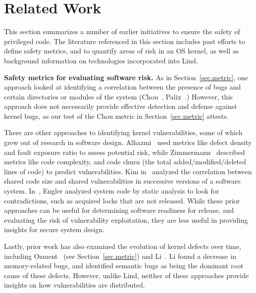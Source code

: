 \section{Related Work}
\label{sec.related_work}

This section summarizes a number of earlier initiatives to ensure the safety of
 privileged code. %
The literature referenced in this section includes past efforts to define safety metrics,
and to quantify areas of risk in an OS kernel, as well as background information
 on technologies incorporated into Lind.

\textbf{Safety metrics for evaluating software risk.}
As in Section~\ref{sec.metric}, one 
approach looked at identifying a correlation between the presence of bugs
and certain directories or modules of the system (Chou~\cite{PittSFIeld},
Palix~\cite{palix2011faults}.)
However, this approach does not necessarily
provide effective detection and defense against kernel bugs, as our test of the
Chou metric in Section~\ref{sec.metric} attests.

There are other approaches to identifying kernel vulnerabilities, some of
which grew out of research in 
software design.
Alhazmi~\cite{alhazmi2008application}
used metrics like defect density and fault exposure ratio to assess potential risk,
while Zimmermann~\cite{zimmermann2010searching}
described metrics like code complexity, and code churn (the total added/modified/deleted 
lines of code) to predict vulnerabilities. Kim in~\cite{kim2007vulnerability} analyzed
the correlation between shared code size and shared vulnerabilities in
successive versions of a software system. In~\cite{engler2001bugs}, Engler analyzed
system code by static analysis to look for contradictions, such as acquired locks that are
not released. While
these prior approaches can be useful for determining software readiness for release, and
evaluating the risk of vulnerability exploitation,
they are less useful in providing insights for secure system design.

Lastly, prior work has also examined the evolution of kernel defects over time, including
Ozment~\cite{ozment2006milk} (see Section~\ref{sec.metric}) and Li~\cite{li2006have}.
Li found a decrease in memory-related
bugs, and identified semantic bugs as being the dominant root cause of these
defects.
However, unlike Lind, neither of these approaches provide insights
on how vulnerabilities are distributed.


